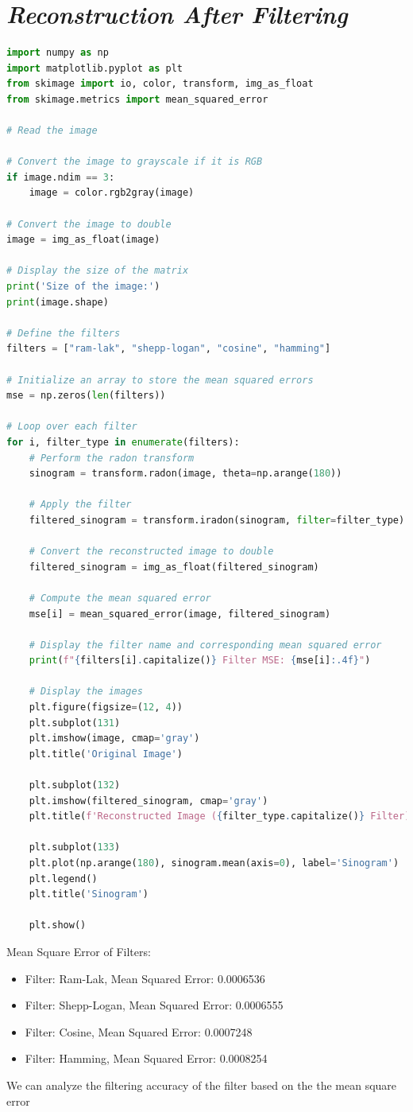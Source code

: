 \documentclass{article}
\begin{document}
\section{\textit{Reconstruction After Filtering}}
\begin{lstlisting}[language=Python, style=python, caption={Reconstructing Sinogram After Filtering}]
import numpy as np
import matplotlib.pyplot as plt
from skimage import io, color, transform, img_as_float
from skimage.metrics import mean_squared_error

# Read the image

# Convert the image to grayscale if it is RGB
if image.ndim == 3:
    image = color.rgb2gray(image)

# Convert the image to double
image = img_as_float(image)

# Display the size of the matrix
print('Size of the image:')
print(image.shape)

# Define the filters
filters = ["ram-lak", "shepp-logan", "cosine", "hamming"]

# Initialize an array to store the mean squared errors
mse = np.zeros(len(filters))

# Loop over each filter
for i, filter_type in enumerate(filters):
    # Perform the radon transform
    sinogram = transform.radon(image, theta=np.arange(180))

    # Apply the filter
    filtered_sinogram = transform.iradon(sinogram, filter=filter_type)

    # Convert the reconstructed image to double
    filtered_sinogram = img_as_float(filtered_sinogram)

    # Compute the mean squared error
    mse[i] = mean_squared_error(image, filtered_sinogram)

    # Display the filter name and corresponding mean squared error
    print(f"{filters[i].capitalize()} Filter MSE: {mse[i]:.4f}")

    # Display the images
    plt.figure(figsize=(12, 4))
    plt.subplot(131)
    plt.imshow(image, cmap='gray')
    plt.title('Original Image')

    plt.subplot(132)
    plt.imshow(filtered_sinogram, cmap='gray')
    plt.title(f'Reconstructed Image ({filter_type.capitalize()} Filter)\nMSE: {mse[i]:.4f}')

    plt.subplot(133)
    plt.plot(np.arange(180), sinogram.mean(axis=0), label='Sinogram')
    plt.legend()
    plt.title('Sinogram')

    plt.show()

\end{lstlisting}
Mean Square Error of Filters:
\begin{itemize}
    \item Filter: Ram-Lak, Mean Squared Error: 0.0006536
\item Filter: Shepp-Logan, Mean Squared Error: 0.0006555
\item Filter: Cosine, Mean Squared Error: 0.0007248
\item Filter: Hamming, Mean Squared Error: 0.0008254
\end{itemize}
We can analyze the filtering accuracy of the filter based on the the mean square error
\newpage
\end{document}
